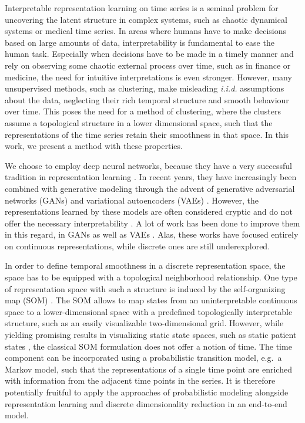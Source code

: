 \documentclass{article}
\begin{document}
Interpretable representation learning on time series is a seminal problem for uncovering the latent structure in complex systems, such as chaotic dynamical systems or medical time series.
In areas where humans have to make decisions based on large amounts of data, interpretability is fundamental to ease the human task.
Especially when decisions have to be made in a timely manner and rely on observing some chaotic external process over time, such as in finance or medicine, the need for intuitive interpretations is even stronger.
However, many unsupervised methods, such as clustering, make misleading \emph{i.i.d.} assumptions about the data, neglecting their rich temporal structure and smooth behaviour over time.
This poses the need for a method of clustering, where the clusters assume a topological structure in a lower dimensional space, such that the representations of the time series retain their smoothness in that space.
In this work, we present a method with these properties.

We choose to employ deep neural networks, because they have a very successful tradition in representation learning \citep{Bengio2012}.
In recent years, they have increasingly been combined with generative modeling through the advent of generative adversarial networks (GANs) \citep{Goodfellow2014} and variational autoencoders (VAEs) \citep{Kingma2013}.
However, the representations learned by these models are often considered cryptic and do not offer the necessary interpretability \citep{Chen2016a}.
A lot of work has been done to improve them in this regard, in GANs \citep{Chen2016a} as well as VAEs \citep{Higgins2017, Esmaeili2018}.
Alas, these works have focused entirely on continuous representations, while discrete ones are still underexplored.

In order to define temporal smoothness in a discrete representation space, the space has to be equipped with a topological neighborhood relationship.
One type of representation space with such a structure is induced by the self-organizing map (SOM) \citep{Kohonen1998}.
The SOM allows to map states from an uninterpretable continuous space to a lower-dimensional space with a predefined topologically interpretable structure, such as an easily visualizable two-dimensional grid.
However, while yielding promising results in visualizing static state spaces, such as static patient states \citep{Tirunagari2015}, the classical SOM formulation does not offer a notion of time.
The time component can be incorporated using a probabilistic transition model, e.g.\ a Markov model, such that the representations of a single time point are enriched with information from the adjacent time points in the series.
It is therefore potentially fruitful to apply the approaches of probabilistic modeling alongside representation learning and discrete dimensionality reduction in an end-to-end model.
\end{document}
